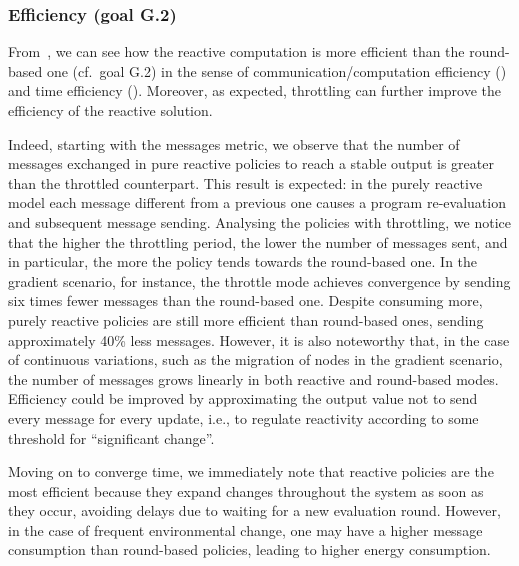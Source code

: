 
\subsubsection{Efficiency (goal G.2)} 
%
From~,
we can see how the reactive computation is more efficient than the round-based one
(cf.\ goal G.2)
in the sense of communication/computation efficiency
()
and time efficiency ().
%
Moreover, as expected, throttling can further improve the efficiency of the reactive solution.


Indeed, starting with the messages metric, we observe that 
 the number of messages exchanged in pure reactive policies to reach a stable output is greater than the throttled counterpart.
%  
This result is expected:
 in the purely reactive model
 each message different from a previous one
 causes a program re-evaluation and subsequent message sending.
%
Analysing the policies with throttling, 
 we notice that the higher the throttling period, 
 the lower the number of messages sent, 
 and in particular, the 
 more the policy tends towards the round-based one.
% 
In the gradient scenario, for instance, 
 the throttle mode achieves convergence 
 by sending six times fewer messages than the round-based one.
%
Despite consuming more, 
 purely reactive policies are still more efficient than round-based ones,
sending approximately 40\% less messages.
%
However, it is also noteworthy that, 
 in the case of continuous variations, 
 such as the migration of nodes in the gradient scenario,
the number of messages grows linearly in both reactive and round-based modes.
%
%
Efficiency could be improved by approximating the output value
not to send every message for every update,
i.e., to regulate reactivity according to some threshold for ``significant change''.

Moving on to converge time, 
 we immediately note that reactive policies are the most efficient
 because they expand changes throughout the system as soon as they occur, 
 avoiding delays due to waiting for a new evaluation round.
%
However, in the case of frequent environmental change, 
 one may have a higher message consumption than round-based policies, 
 leading to higher energy consumption.

